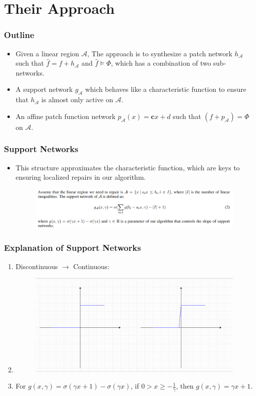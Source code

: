 \documentclass[aspectratio=169 %
,serif,mathserif]{beamer}
\begin{document}
\section{Their Approach}
\begin{frame}
	\frametitle{Outline}
	\begin{itemize}
		\item Given a linear region $\mathcal{A}$, The approach is to synthesize a patch network $h_{\mathcal{A}}$ such that $\widehat{f}=f+h_{\mathcal{A}}$ and $\widehat{f} \models \Phi$, which has a combination of two sub-networks.
		\item A support network $g_{\mathcal{A}}$ which behaves like a characteristic function to ensure that $h_{\mathcal{A}}$ is almost only active on $\mathcal{A}$.
		\item An affine patch function network $p_{\mathcal{A}}(x)=\boldsymbol{c} x+d$ such that $\left(f+p_{\mathcal{A}}\right)=\Phi$ on $\mathcal{A}$.		
	\end{itemize}
\end{frame}

\begin{frame}
	\frametitle{Support Networks}
	\begin{itemize}
		\item This structure approximates the characteristic function, which are keys to ensuring localized repairs in our algorithm.
		\begin{figure}[htbp]
			\includegraphics[width=1\linewidth]{3.png}
		\end{figure}
	\end{itemize}
\end{frame}

\begin{frame}
	\frametitle{Explanation of Support Networks}
	\begin{enumerate}
		\item Discontinuous $\to$ Continuous:
		\item \begin{figure}[htbp]
			\includegraphics[width=.5\linewidth]{4.png}
		\end{figure}
		\item For $g(x, \gamma)=\sigma(\gamma x+1)-\sigma(\gamma x)$, if $0>x \geq -\frac{1}{\gamma}$, then $g(x, \gamma)=\gamma x+1$.
	\end{enumerate}	
\end{frame}
\end{document}
